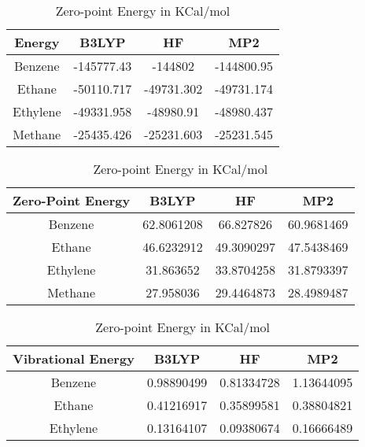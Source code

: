\clearpage
\begin{table}[htbp]
\caption{Raw data obtained for Equation 0}\label{tab:reaction-0-raw}
\vspace*{1 cm}
\begin{subtable}[h]{\textwidth}
\centering
\begin{tabular}{|c|c|c|c|}
\hline
Energy             & B3LYP      & HF         & MP2        \\ \hline
Benzene            & -145777.43 & -144802    & -144800.95 \\
Ethane             & -50110.717 & -49731.302 & -49731.174 \\
Ethylene           & -49331.958 & -48980.91  & -48980.437 \\
Methane            & -25435.426 & -25231.603 & -25231.545 \\ \hline
\end{tabular}
\caption{Internal Energy in KCal/mol}
\end{subtable}
\vspace{\fill}
\begin{subtable}[h]{\textwidth}
\vspace*{1 cm}
\centering
\begin{tabular}{|c|c|c|c|}
\hline
Zero-Point Energy  & B3LYP      & HF         & MP2        \\ \hline
Benzene            & 62.8061208 & 66.827826  & 60.9681469 \\
Ethane             & 46.6232912 & 49.3090297 & 47.5438469 \\
Ethylene           & 31.863652  & 33.8704258 & 31.8793397 \\
Methane            & 27.958036  & 29.4464873 & 28.4989487 \\ \hline
\end{tabular}
\caption{Zero-point Energy in KCal/mol}
\end{subtable}
\vspace{\fill}
\begin{subtable}[h]{\textwidth}
\vspace*{1 cm}
\centering
\begin{tabular}{|c|c|c|c|}
\hline
Vibrational Energy & B3LYP      & HF         & MP2        \\ \hline
Benzene            & 0.98890499 & 0.81334728 & 1.13644095 \\
Ethane             & 0.41216917 & 0.35899581 & 0.38804821 \\
Ethylene           & 0.13164107 & 0.09380674 & 0.16666489 \\

\end{tabular}
\end{subtable}
\end{table}
